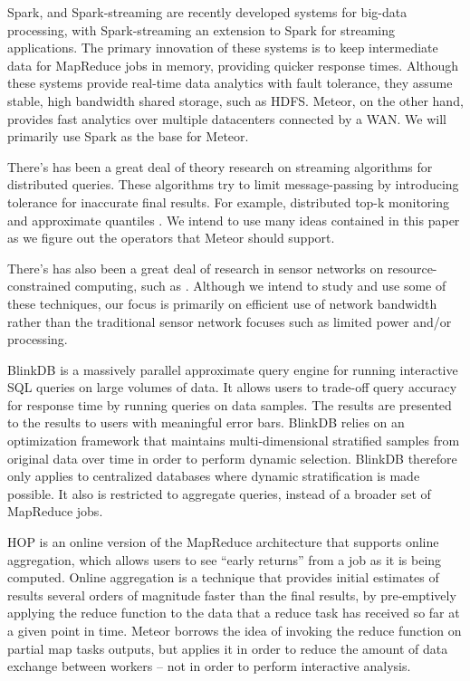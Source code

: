 Spark, and Spark-streaming \cite{1} are recently developed systems for big-data processing, with Spark-streaming an extension to Spark for streaming applications. The primary innovation of these systems is to keep intermediate data for MapReduce jobs in memory, providing quicker response times. Although these systems provide real-time data analytics with fault tolerance, they assume stable, high bandwidth shared storage, such as HDFS. Meteor, on the other hand, provides fast analytics over multiple datacenters connected by a WAN. We will primarily use Spark as the base for Meteor.  

There’s has been a great deal of theory research on streaming algorithms for distributed queries. These algorithms try to limit message-passing by introducing tolerance for inaccurate final results. For example, distributed top-k monitoring \cite{3} and approximate quantiles \cite{6}. We intend to use many ideas contained in this paper as we figure out the operators that Meteor should support. 

There’s has also been a great deal of research in sensor networks on resource-constrained computing, such as \cite{7}. Although we intend to study and use some of these techniques, our focus is primarily on efficient use of network bandwidth rather than the traditional sensor network focuses such as limited power and/or processing.  

BlinkDB \cite{5} is a massively parallel approximate query engine for running interactive SQL queries on large volumes of data. It allows users to trade-off query accuracy for response time by running queries on data samples. The results are presented to the results to users with meaningful error bars. BlinkDB relies on an optimization framework that maintains multi-dimensional stratified samples from original data over time in order to perform dynamic selection. BlinkDB therefore only applies to centralized databases where dynamic stratification is made possible. It also is restricted to aggregate queries, instead of a broader set of MapReduce jobs.

HOP \cite{4} is an online version of the MapReduce architecture that supports online aggregation, which allows users to see “early returns” from a job as it is being computed. Online aggregation is a technique that provides initial estimates of results several orders of magnitude faster than the final results, by pre-emptively applying the reduce function to the data that a reduce task has received so far at a given point in time. Meteor borrows the idea of  invoking the reduce function on partial map tasks outputs, but applies it in order to reduce the amount of data exchange between workers – not in order to perform interactive analysis.
